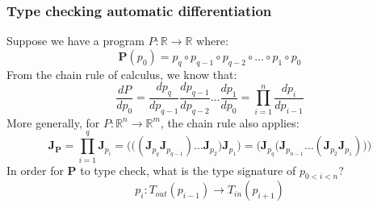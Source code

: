 \documentclass{beamer}
\begin{document}
    \begin{frame}
        \frametitle{Type checking automatic differentiation}
        Suppose we have a program $P: \mathbb{R}\rightarrow\mathbb{R}$ where:
        \begin{equation}
            \mathbf{P}(p_0)=p_q \circ p_{q-1} \circ p_{q-2} \circ \dots \circ p_1 \circ p_0
        \end{equation}
        From the chain rule of calculus, we know that:
        \begin{equation}
            \frac{dP}{dp_0} = \frac{dp_q}{dp_{q-1}}\frac{dp_{q-1}}{dp_{q-2}}\dots\frac{dp_1}{dp_0}= {\displaystyle \prod_{i=1}^{n} \frac{dp_{i}}{dp_{i-1}}}
        \end{equation}
        More generally, for $P: \mathbb{R}^n\rightarrow\mathbb{R}^m$, the chain rule also applies:
        \begin{equation}
            \mathbf{J}_\mathbf{P} = \displaystyle \prod_{i=1}^{q} \mathbf{J}_{p_i} = \bigg(\Big((\mathbf{J}_{p_q} \mathbf{J}_{p_{q-1}}) \dots \mathbf{J}_{p_2}\Big) \mathbf{J}_{p_1}\bigg) = \bigg(\mathbf{J}_{p_q} \Big(\mathbf{J}_{p_{n-1}} \dots (\mathbf{J}_{p_2} \mathbf{J}_{p_1})\Big)\bigg)
        \end{equation}
        In order for $\mathbf{P}$ to type check, what is the type signature of $p_{0<i<n}$?
        \begin{equation}
            p_i: T_{out}(p_{i-1}) \rightarrow T_{in}(p_{i+1})
        \end{equation}
    \end{frame}

\end{document}
